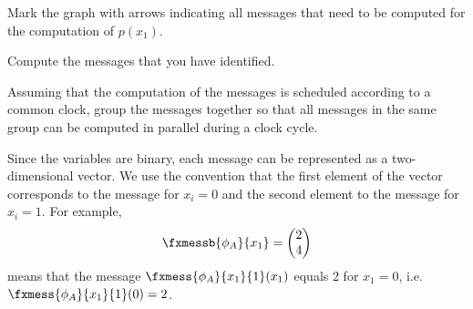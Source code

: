 \begin{exenumerate}

\item Mark the graph with arrows indicating all messages that need to
  be computed for the computation of $p(x_1)$.

  \begin{solution}
    
    \begin{center}
    \end{center}
    
  \end{solution}
  
\item \label{q:messages} Compute the messages that you have
  identified.

  Assuming that the computation of the messages is scheduled according
  to a common clock, group the messages together so that all messages
  in the same group can be computed in parallel during a clock
  cycle.
     
  \begin{solution}
    Since the variables are binary, each message can be represented as a two-dimensional vector. We use the convention that the first element of the vector corresponds to the message for $x_i =0$ and the second element to the message for $x_i=1$. For example,
    \begin{equation}
      \fxmessb{\phi_A}{x_1}= \begin{pmatrix}
        2 \\
        4 \\
      \end{pmatrix}
    \end{equation}
means that the message $\fxmess{\phi_A}{x_1}{1}(x_1)$ equals 2 for $x_1=0$, i.e.\ $\fxmess{\phi_A}{x_1}{1}(0)=2$.


\end{solution}
\end{exenumerate}
